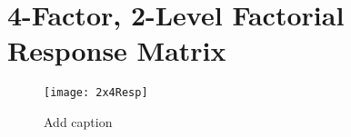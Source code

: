 \chapter{4-Factor, 2-Level Factorial Response Matrix} 
\begin{sidewaysfigure}
	\begin{center}
\texttt{[image: 2x4Resp]}
\end{center}
	\caption{Add caption}
\end{sidewaysfigure}

\cleardoublepage